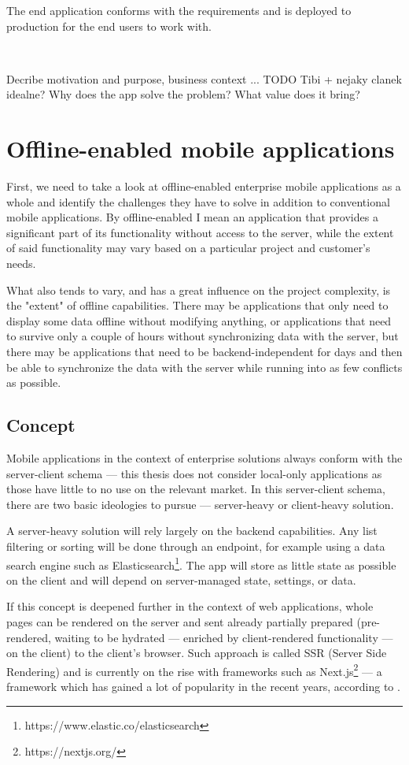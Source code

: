 \documentclass[
  digital,     %
  color,       %
  oneside,     %
  nosansbold,  %
  nocolorbold, %
  lof,         %
  lot,         %
]{fithesis4}
\begin{document}
The end application conforms with the requirements and is deployed to production for the end users to work with.

~

Decribe motivation and purpose, business context ... TODO Tibi + nejaky clanek idealne?
Why does the app solve the problem? What value does it bring?

\chapter{Offline-enabled mobile applications}
First, we need to take a look at offline-enabled enterprise mobile applications as a whole and identify the challenges they have to solve in addition to conventional mobile applications. By offline-enabled I mean an application that provides a significant part of its functionality without access to the server, while the extent of said functionality may vary based on a particular project and customer's needs. 

What also tends to vary, and has a great influence on the project complexity, is the "extent" of offline capabilities. There may be applications that only need to display some data offline without modifying anything, or applications that need to survive only a couple of hours without synchronizing data with the server, but there may be applications that need to be backend-independent for days and then be able to synchronize the data with the server while running into as few conflicts as possible.
\section{Concept}
Mobile applications in the context of enterprise solutions always conform with the server-client schema --- this thesis does not consider local-only applications as those have little to no use on the relevant market. In this server-client schema, there are two basic ideologies to pursue --- server-heavy or client-heavy solution. 

A server-heavy solution will rely largely on the backend capabilities. Any list filtering or sorting will be done through an endpoint, for example using a data search engine such as Elasticsearch\footnote{https://www.elastic.co/elasticsearch}. The app will store as little state as possible on the client and will depend on server-managed state, settings, or data. 

If this concept is deepened further in the context of web applications, whole pages can be rendered on the server and sent already partially prepared (pre-rendered, waiting to be hydrated --- enriched by client-rendered functionality --- on the client) to the client's browser. Such approach is called SSR (Server Side Rendering) and is currently on the rise with frameworks such as Next.js\footnote{https://nextjs.org/} --- a framework which has gained a lot of popularity in the recent years, according to .
\end{document}
